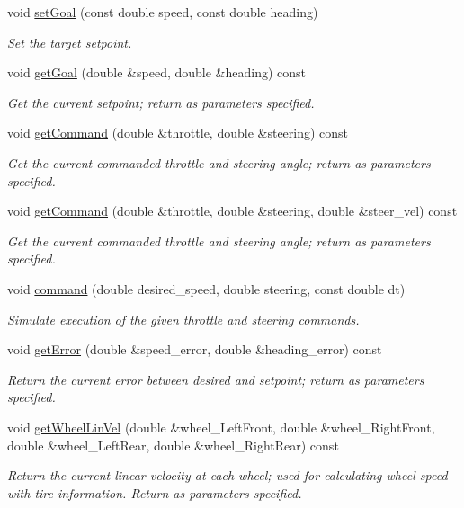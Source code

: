 \begin{DoxyCompactItemize}
void \hyperlink{classackermann_1_1_model_a09d9ac604f91d339eae4b18a85db9732}{set\+Goal} (const double speed, const double heading)
\begin{DoxyCompactList}\small\item\em Set the target setpoint. \end{DoxyCompactList}\item 
void \hyperlink{classackermann_1_1_model_a37c42fe7705a2b3106b0faff813bfcad}{get\+Goal} (double \&speed, double \&heading) const
\begin{DoxyCompactList}\small\item\em Get the current setpoint; return as parameters specified. \end{DoxyCompactList}\item 
void \hyperlink{classackermann_1_1_model_a24f1fd6f59b6daa78b1f99f5f2029b56}{get\+Command} (double \&throttle, double \&steering) const
\begin{DoxyCompactList}\small\item\em Get the current commanded throttle and steering angle; return as parameters specified. \end{DoxyCompactList}\item 
void \hyperlink{classackermann_1_1_model_a3f0eaa6a1b63479e4d59689bc6e60c71}{get\+Command} (double \&throttle, double \&steering, double \&steer\+\_\+vel) const
\begin{DoxyCompactList}\small\item\em Get the current commanded throttle and steering angle; return as parameters specified. \end{DoxyCompactList}\item 
void \hyperlink{classackermann_1_1_model_a62226204f92b8c1c7cca0a11f616d7fd}{command} (double desired\+\_\+speed, double steering, const double dt)
\begin{DoxyCompactList}\small\item\em Simulate execution of the given throttle and steering commands. \end{DoxyCompactList}\item 
void \hyperlink{classackermann_1_1_model_a4b91f4da42041ac667e49116b4f1040d}{get\+Error} (double \&speed\+\_\+error, double \&heading\+\_\+error) const
\begin{DoxyCompactList}\small\item\em Return the current error between desired and setpoint; return as parameters specified. \end{DoxyCompactList}\item 
void \hyperlink{classackermann_1_1_model_a571711ea578e1ccaa7bc23528a53ba95}{get\+Wheel\+Lin\+Vel} (double \&wheel\+\_\+\+Left\+Front, double \&wheel\+\_\+\+Right\+Front, double \&wheel\+\_\+\+Left\+Rear, double \&wheel\+\_\+\+Right\+Rear) const
\begin{DoxyCompactList}\small\item\em Return the current linear velocity at each wheel; used for calculating wheel speed with tire information. Return as parameters specified. \end{DoxyCompactList}\end{DoxyCompactItemize}


